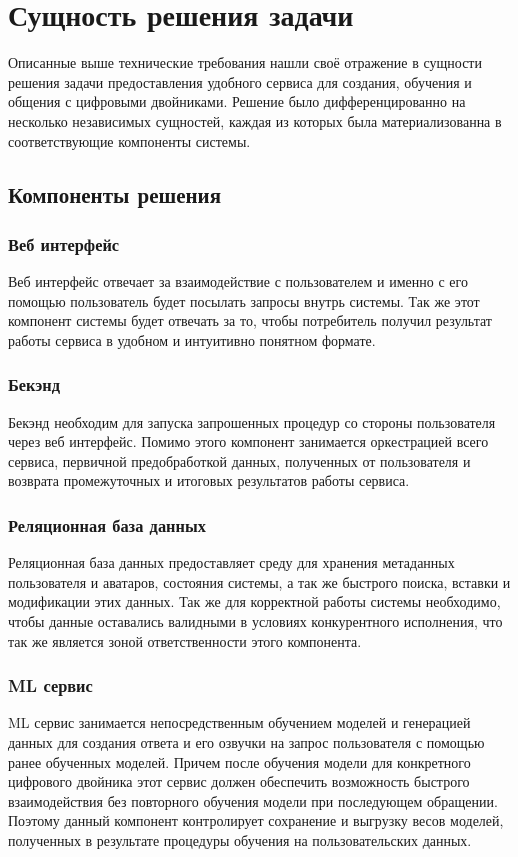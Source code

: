 \chapter{Сущность решения задачи}

Описанные выше технические требования нашли своё отражение в сущности решения задачи предоставления удобного сервиса для создания, обучения и общения с цифровыми двойниками. Решение было дифференцированно на несколько независимых сущностей, каждая из которых была материализованна в соответствующие компоненты системы.

\section{Компоненты решения}
\subsection{Веб интерфейс}
Веб интерфейс отвечает за взаимодействие с пользователем и именно с его помощью пользователь будет посылать запросы внутрь системы. Так же этот компонент системы будет отвечать за то, чтобы потребитель получил результат работы сервиса в удобном и интуитивно понятном формате.

\subsection{Бекэнд}
Бекэнд необходим для запуска запрошенных процедур со стороны пользователя через веб интерфейс. Помимо этого компонент занимается оркестрацией всего сервиса, первичной предобработкой данных, полученных от пользователя и возврата промежуточных и итоговых результатов работы сервиса.

\subsection{Реляционная база данных}
Реляционная база данных предоставляет среду для хранения метаданных пользователя и аватаров, состояния системы, а так же быстрого поиска, вставки и модификации этих данных. Так же для корректной работы системы необходимо, чтобы данные оставались валидными в условиях конкурентного исполнения, что так же является зоной ответственности этого компонента.

\subsection{ML сервис}
ML сервис занимается непосредственным обучением моделей и генерацией данных для создания ответа и его озвучки на запрос пользователя с помощью ранее обученных моделей. Причем после обучения модели для конкретного цифрового двойника этот сервис должен обеспечить возможность быстрого взаимодействия без повторного обучения модели при последующем обращении. Поэтому данный компонент контролирует сохранение и выгрузку весов моделей, полученных в результате процедуры обучения на пользовательских данных.


